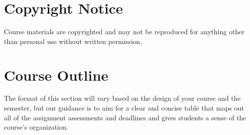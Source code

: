 \documentclass[11pt]{article}
\begin{document}
\hypertarget{copyright-notice}{%
\section{Copyright Notice}\label{copyright-notice}}

Course materials are copyrighted and may not be reproduced for anything
other than personal use without written permission.

\newpage

\hypertarget{course-outline}{%
\section{Course Outline}\label{course-outline}}

The format of this section will vary based on the design of your course
and the semester, but our guidance is to aim for a clear and concise
table that maps out all of the assignment assessments and deadlines and
gives students a sense of the course's organization.
\end{document}
